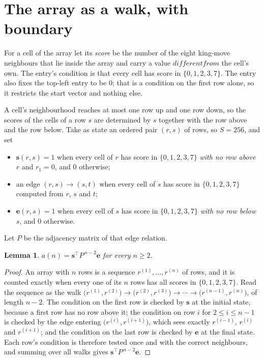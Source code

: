 \documentclass[11pt,a4paper]{article}
\theoremstyle{plain}
\newtheorem{lemma}[theorem]{Lemma}
\theoremstyle{definition}
\begin{document}
\section{The array as a walk, with boundary}

For a cell of the array let its \emph{score} be the number of the eight king-move neighbours that lie inside
the array and carry a value $different from$ the cell's own. The entry's condition is that every cell
has score in $\{0,1,2,3,7\}$. The entry also fixes the top-left entry to be $0$; that is a condition on the first row alone, so it restricts the start vector and nothing else.

A cell's neighbourhood reaches at most one row up and one row down, so the scores of the
cells of a row $s$ are determined by $s$ together with the row above and the row below.
Take as state an ordered pair $(r,s)$ of rows, so $S=256$, and set
\begin{itemize}
\item $\mathbf{s}(r,s)=1$ when every cell of $r$ has score in $\{0,1,2,3,7\}$ \emph{with no row
above $r$} and $r_1=0$, and $0$ otherwise;
\item an edge $(r,s)\to(s,t)$ when every cell of $s$ has score in $\{0,1,2,3,7\}$ computed from
$r$, $s$ and $t$;
\item $\mathbf{e}(r,s)=1$ when every cell of $s$ has score in $\{0,1,2,3,7\}$ \emph{with no row
below $s$}, and $0$ otherwise.
\end{itemize}
Let $P$ be the adjacency matrix of that edge relation.

\begin{lemma}\label{lem:walk}
$a(n)=\mathbf{s}^{\!\top}P^{\,n-2}\mathbf{e}$ for every $n\ge2$.
\end{lemma}

\begin{proof}
An array with $n$ rows is a sequence $r^{(1)},\dots,r^{(n)}$ of rows, and it is counted
exactly when every one of its $n$ rows has all scores in $\{0,1,2,3,7\}$. Read the sequence as the
walk $\bigl(r^{(1)},r^{(2)}\bigr)\to\bigl(r^{(2)},r^{(3)}\bigr)\to\cdots\to
\bigl(r^{(n-1)},r^{(n)}\bigr)$, of length $n-2$. The condition on the first row is
checked by $\mathbf{s}$ at the initial state, because a first row has no row above it; the
condition on row $i$ for $2\le i\le n-1$ is checked by the edge entering
$\bigl(r^{(i)},r^{(i+1)}\bigr)$, which sees exactly $r^{(i-1)}$, $r^{(i)}$ and
$r^{(i+1)}$; and the condition on the last row is checked by $\mathbf{e}$ at the final
state. Each row's condition is therefore tested once and with the correct neighbours, and
summing over all walks gives $\mathbf{s}^{\!\top}P^{\,n-2}\mathbf{e}$.
\end{proof}
\end{document}
